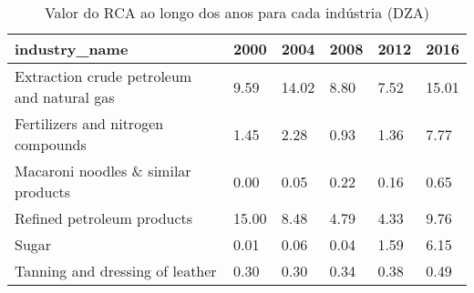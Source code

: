 \begin{table}
\centering
\caption{Valor do RCA ao longo dos anos para cada indústria (DZA)}
\begin{tabular}{p{6cm}p{1.5cm}p{1.5cm}p{1.5cm}p{1.5cm}p{1.5cm}}
\toprule
                             industry\_name &  2000 &  2004 & 2008 & 2012 &  2016 \\
\midrule
Extraction crude petroleum and natural gas &  9.59 & 14.02 & 8.80 & 7.52 & 15.01 \\
        Fertilizers and nitrogen compounds &  1.45 &  2.28 & 0.93 & 1.36 &  7.77 \\
       Macaroni noodles \& similar products &  0.00 &  0.05 & 0.22 & 0.16 &  0.65 \\
                Refined petroleum products & 15.00 &  8.48 & 4.79 & 4.33 &  9.76 \\
                                     Sugar &  0.01 &  0.06 & 0.04 & 1.59 &  6.15 \\
           Tanning and dressing of leather &  0.30 &  0.30 & 0.34 & 0.38 &  0.49 \\
\bottomrule
\end{tabular}
\end{table}

